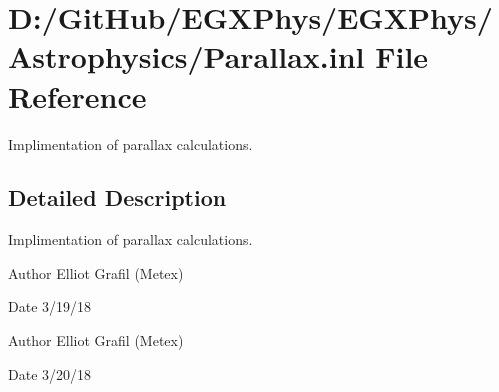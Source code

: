\hypertarget{_parallax_8inl}{}\section{D\+:/\+Git\+Hub/\+E\+G\+X\+Phys/\+E\+G\+X\+Phys/\+Astrophysics/\+Parallax.inl File Reference}
\label{_parallax_8inl}


Implimentation of parallax calculations.  




\subsection{Detailed Description}
Implimentation of parallax calculations. 

\begin{DoxyAuthor}{Author}
Elliot Grafil (Metex) 
\end{DoxyAuthor}
\begin{DoxyDate}{Date}
3/19/18
\end{DoxyDate}
\begin{DoxyAuthor}{Author}
Elliot Grafil (Metex) 
\end{DoxyAuthor}
\begin{DoxyDate}{Date}
3/20/18 
\end{DoxyDate}
